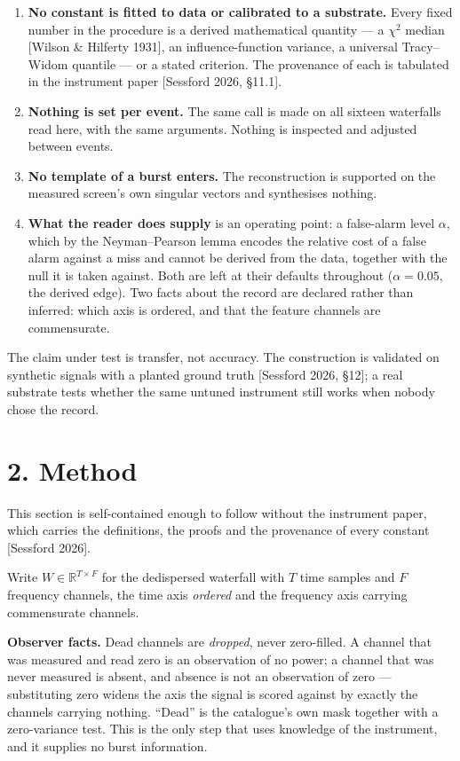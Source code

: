 \documentclass[10pt,letterpaper,twocolumn]{article}
\providecommand{\tightlist}{\setlength{\itemsep}{0pt}\setlength{\parskip}{0pt}}
\begin{document}
\begin{enumerate}
\def\labelenumi{\arabic{enumi}.}
\tightlist
\item
  \textbf{No constant is fitted to data or calibrated to a substrate.} Every fixed number in the procedure is a derived mathematical quantity --- a \(\chi^2\) median {[}Wilson \& Hilferty 1931{]}, an influence-function variance, a universal Tracy--Widom quantile --- or a stated criterion. The provenance of each is tabulated in the instrument paper {[}Sessford 2026, §11.1{]}.
\item
  \textbf{Nothing is set per event.} The same call is made on all sixteen waterfalls read here, with the same arguments. Nothing is inspected and adjusted between events.
\item
  \textbf{No template of a burst enters.} The reconstruction is supported on the measured screen's own singular vectors and synthesises nothing.
\item
  \textbf{What the reader does supply} is an operating point: a false-alarm level \(\alpha\), which by the Neyman--Pearson lemma encodes the relative cost of a false alarm against a miss and cannot be derived from the data, together with the null it is taken against. Both are left at their defaults throughout (\(\alpha=0.05\), the derived edge). Two facts about the record are declared rather than inferred: which axis is ordered, and that the feature channels are commensurate.
\end{enumerate}

The claim under test is transfer, not accuracy. The construction is validated on synthetic signals with a planted ground truth {[}Sessford 2026, §12{]}; a real substrate tests whether the same untuned instrument still works when nobody chose the record.

\section{2. Method}\label{2-method}

This section is self-contained enough to follow without the instrument paper, which carries the definitions, the proofs and the provenance of every constant {[}Sessford 2026{]}.

Write \(W\in\mathbb{R}^{T\times F}\) for the dedispersed waterfall with \(T\) time samples and \(F\) frequency channels, the time axis \emph{ordered} and the frequency axis carrying commensurate channels.

\textbf{Observer facts.} Dead channels are \emph{dropped}, never zero-filled. A channel that was measured and read zero is an observation of no power; a channel that was never measured is absent, and absence is not an observation of zero --- substituting zero widens the axis the signal is scored against by exactly the channels carrying nothing. ``Dead'' is the catalogue's own mask together with a zero-variance test. This is the only step that uses knowledge of the instrument, and it supplies no burst information.
\end{document}
